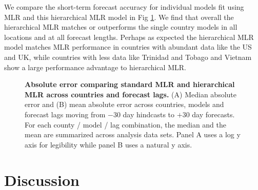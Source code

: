 \documentclass[10pt,letterpaper]{article}
\begin{document}
We compare the short-term forecast accuracy for individual models fit using MLR and this hierarchical MLR model in Fig \ref{fig:Fig7}.
We find that overall the hierarchical MLR matches or outperforms the single country models in all locations and at all forecast lengths.
Perhaps as expected the hierarchical MLR model matches MLR performance in countries with abundant data like the US and UK, while countries with less data like Trinidad and Tobago and Vietnam show a large performance advantage to hierarchical MLR.


\begin{figure}[h!]
	\centering
	\caption{\textbf{Absolute error comparing standard MLR and hierarchical MLR across countries and forecast lags.}
	(A) Median absolute error and (B) mean absolute error across countries, models and forecast lags moving from $-30$ day hindcasts to $+30$ day forecasts.
	For each county / model / lag combination, the median and the mean are summarized across analysis data sets.
	Panel A uses a log y axis for legibility while panel B uses a natural y axis.
	}
	\label{fig:Fig7}
\end{figure}


\section*{Discussion}

\end{document}
